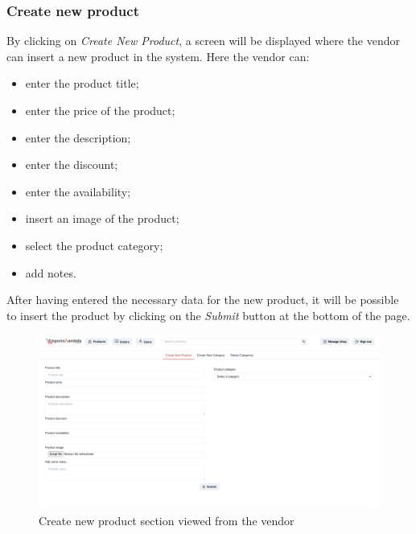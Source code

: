 \subsubsection{Create new product}
By clicking on \textit{Create New Product}, a screen will be displayed where the vendor can insert a new product in the system. Here the vendor can:
\begin {itemize}
\item enter the product title;
\item enter the price of the product;
\item enter the description;
\item enter the discount;
\item enter the availability;
\item insert an image of the product;
\item select the product category;
\item add notes.
\end {itemize}
After having entered the necessary data for the new product, it will be possible to insert the product by clicking on the \textit{Submit} button at the bottom of the page.
\begin{figure}[!ht]
    \caption{Create new product section viewed from the vendor}
    \vspace{5px}
    \includegraphics[scale=0.25]{../../../../Images/userManual/createNewProductVendor.png}
    \centering
\end{figure}
\pagebreak
